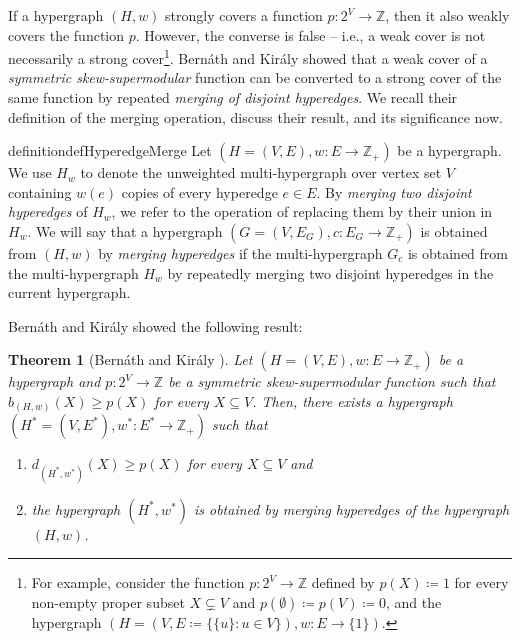 \documentclass{article}
\newtheorem{theorem}{Theorem}[section]
\providecommand{\Z}{\mathbb{Z}}
\begin{document}
If a hypergraph $(H, w)$ strongly covers a function $p:2^V\rightarrow \Z$, then it also weakly covers the function $p$. However, the converse is false -- i.e., a weak cover is not necessarily a strong cover\footnote{For example, consider the function $p: 2^V\rightarrow \Z$ defined by $p(X)\coloneqq 1$ for every non-empty proper subset $X\subsetneq V$ and $p(\emptyset)\coloneqq p(V)\coloneqq 0$, and the hypergraph $(H=(V, E\coloneqq \{\{u\}: u\in V\}), w: E\rightarrow \{1\})$.}.  
Bern\'{a}th and Kir\'{a}ly \cite{Bernath-Kiraly} showed 
that a weak cover of a \emph{symmetric skew-supermodular} function can be converted to a strong cover of the same function by repeated \emph{merging of disjoint hyperedges}. 
We recall their definition of the merging operation, discuss their result, and its significance now. 
\begin{restatable}{definition}{defHyperedgeMerge}\label{def:WeakToStrongCover:hyperedge-merge}
Let $(H=(V, E), w: E\rightarrow \Z_+)$ be a hypergraph. 
We use $H_w$ to denote the unweighted multi-hypergraph over vertex set $V$ containing $w(e)$ copies of every hyperedge $e\in E$.  
By \emph{merging two disjoint hyperedges} of $H_w$, we refer to the operation of replacing them by their union in $H_w$. 
We will say that a hypergraph $(G=(V, E_G), c: E_G\rightarrow \Z_+)$ is obtained from $(H, w)$ by \emph{merging hyperedges} if the multi-hypergraph $G_c$ is obtained from the multi-hypergraph $H_w$ by repeatedly merging two disjoint hyperedges in the current hypergraph. 
\end{restatable}
Bern\'{a}th and Kir\'{a}ly showed the following result: 
\begin{theorem}[Bern\'{a}th and Kir\'{a}ly \cite{Bernath-Kiraly}]\label{thm:bernath-kiraly}
    Let $(H=(V, E), w: E\rightarrow \Z_+)$ be a hypergraph and $p:2^V\rightarrow \Z$ be a symmetric skew-supermodular function such that 
$b_{(H, w)}(X) \geq p(X)$ for every $X \subseteq V$. 
Then, there exists a hypergraph $\left(H^* = (V, E^*), w^*:E^* \rightarrow\Z_+\right)$ 
such that
\begin{enumerate}[label=$(\arabic*)$]
    \item $d_{(H^*, w^*)}(X) \geq p(X)$ for every $X\subseteq V$ and 
    \item the hypergraph $(H^*,w^*)$ is obtained by merging hyperedges of the hypergraph $(H, w)$.
\end{enumerate}
\end{theorem}
\end{document}
